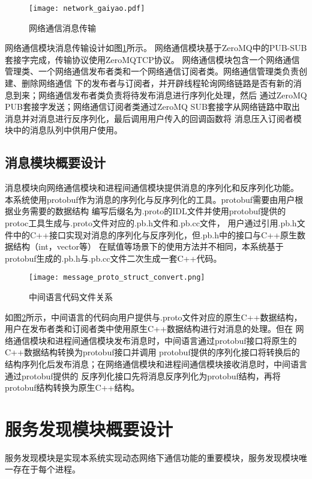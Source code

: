\begin{figure}[H]
  \centering
  \texttt{[image: network\_gaiyao.pdf]}
  \caption{网络通信消息传输}
  \label{network_gaiyao}
\end{figure}

网络通信模块消息传输设计如图\ref{network_gaiyao}所示。
网络通信模块基于ZeroMQ中的PUB-SUB套接字完成，传输协议使用ZeroMQTCP协议。
网络通信模块包含一个网络通信管理类、一个网络通信发布者类和一个网络通信订阅者类。网络通信管理类负责创建、删除网络通信
下的发布者与订阅者，并开辟线程轮询网络链路是否有新的消息到来；网络通信发布者类负责将待发布消息进行序列化处理，然后
通过ZeroMQ PUB套接字发送；网络通信订阅者类通过ZeroMQ SUB套接字从网络链路中取出消息并对消息进行反序列化，最后调用用户传入的回调函数将
消息压入订阅者模块中的消息队列中供用户使用。

\subsection{消息模块概要设计}
消息模块向网络通信模块和进程间通信模块提供消息的序列化和反序列化功能。
本系统使用protobuf作为消息的序列化与反序列化的工具。protobuf需要由用户根据业务需要的数据结构
编写后缀名为.proto的IDL文件并使用protobuf提供的protoc工具生成与.proto文件对应的.pb.h文件和.pb.cc文件，
用户通过引用.pb.h文件中的C++接口实现对消息的序列化与反序列化，但.pb.h中的接口与C++原生数据结构（int，vector等）
在赋值等场景下的使用方法并不相同，本系统基于protobuf生成的.pb.h与.pb.cc文件二次生成一套C++代码。
\begin{figure}[H]
  \centering
  \texttt{[image: message\_proto\_struct\_convert.png]}
  \caption{中间语言代码文件关系}
  \label{proto-struct-convert}
\end{figure}

如图\ref{proto-struct-convert}所示，中间语言的代码向用户提供与.proto文件对应的原生C++数据结构，用户在发布者类和订阅者类中使用原生C++数据结构进行对消息的处理。但在
网络通信模块和进程间通信模块发布消息时，中间语言通过protobuf接口将原生的C++数据结构转换为protobuf接口并调用
protobuf提供的序列化接口将转换后的结构序列化后发布消息；在网络通信模块和进程间通信模块接收消息时，中间语言通过protobuf提供的
反序列化接口先将消息反序列化为protobuf结构，再将protobuf结构转换为原生C++结构。



\section{服务发现模块概要设计}
服务发现模块是实现本系统实现动态网络下通信功能的重要模块，服务发现模块唯一存在于每个进程。


